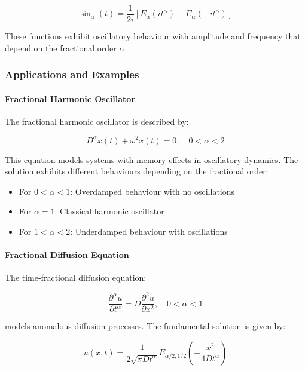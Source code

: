 \begin{equation}
\sin_{\alpha}(t) = \frac{1}{2i}[E_{\alpha}(it^{\alpha}) - E_{\alpha}(-it^{\alpha})]
\end{equation}

These functions exhibit oscillatory behaviour with amplitude and frequency that depend on the fractional order $\alpha$.

\subsubsection{Applications and Examples}

\paragraph{Fractional Harmonic Oscillator}

The fractional harmonic oscillator is described by:

\begin{equation}
D^{\alpha} x(t) + \omega^2 x(t) = 0, \quad 0 < \alpha < 2
\end{equation}

This equation models systems with memory effects in oscillatory dynamics. The solution exhibits different behaviours depending on the fractional order:

\begin{itemize}
    \item For $0 < \alpha < 1$: Overdamped behaviour with no oscillations
    \item For $\alpha = 1$: Classical harmonic oscillator
    \item For $1 < \alpha < 2$: Underdamped behaviour with oscillations
\end{itemize}

\paragraph{Fractional Diffusion Equation}

The time-fractional diffusion equation:

\begin{equation}
\frac{\partial^{\alpha} u}{\partial t^{\alpha}} = D \frac{\partial^2 u}{\partial x^2}, \quad 0 < \alpha < 1
\end{equation}

models anomalous diffusion processes. The fundamental solution is given by:

\begin{equation}
u(x,t) = \frac{1}{2\sqrt{\pi D t^{\alpha}}} E_{\alpha/2,1/2}\left(-\frac{x^2}{4D t^{\alpha}}\right)
\end{equation}

